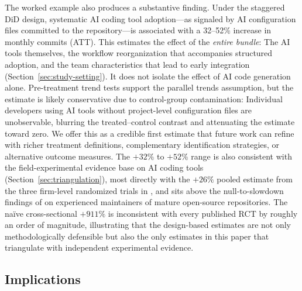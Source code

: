 The worked example also produces a substantive finding.
Under the staggered DiD design, systematic AI coding tool adoption---as signaled by AI configuration files committed to the repository---is associated with a 32--52\% increase in monthly commits (ATT).
This estimates the effect of the \emph{entire bundle}: The AI tools themselves, the workflow reorganization that accompanies structured adoption, and the team characteristics that lead to early integration (Section~\ref{sec:study-setting}).
It does not isolate the effect of AI code generation alone.
Pre-treatment trend tests support the parallel trends assumption, but the estimate is likely conservative due to control-group contamination: Individual developers using AI tools without project-level configuration files are unobservable, blurring the treated--control contrast and attenuating the estimate toward zero.
We offer this as a credible first estimate that future work can refine with richer treatment definitions, complementary identification strategies, or alternative outcome measures.
The $+32\%$ to $+52\%$ range is also consistent with the field-experimental evidence base on AI coding tools (Section~\ref{sec:triangulation}), most directly with the $+26\%$ pooled estimate from the three firm-level randomized trials in \citet{cui2025effects}, and sits above the null-to-slowdown findings of \citet{becker2025measuring} on experienced maintainers of mature open-source repositories.
The na\"ive cross-sectional $+911\%$ is inconsistent with every published RCT by roughly an order of magnitude, illustrating that the design-based estimates are not only methodologically defensible but also the only estimates in this paper that triangulate with independent experimental evidence.

\subsection{Implications}

